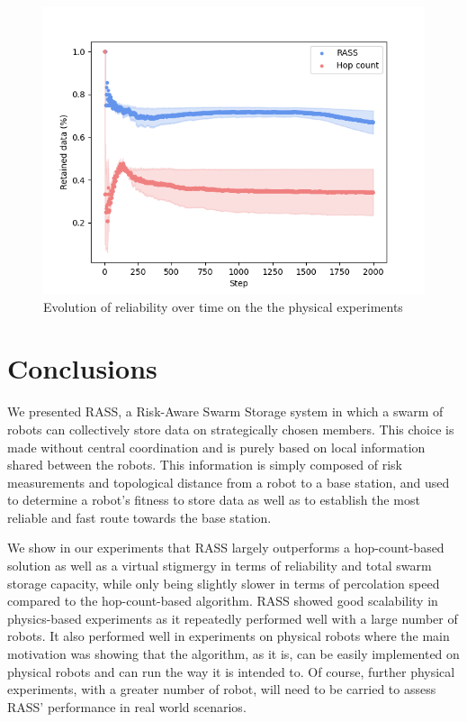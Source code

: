\documentclass[runningheads]{llncs}
\begin{document}
\begin{figure}[h]
	\centering
    \includegraphics[width=0.95\columnwidth]{figures/reliability.png}
    \caption{Evolution of reliability over time on the the physical experiments}
    \label{results:physicalRelaibility}
\vspace{-2mm}
\end{figure}

\section{Conclusions}
\label{conclusion}

We presented RASS, a Risk-Aware Swarm Storage system in which a swarm of robots can collectively store data on strategically chosen members. This choice is made without central coordination and is purely based on local information shared between the robots. This information is simply composed of risk measurements and topological distance from a robot to a base station, and used to determine a robot's fitness to store data as well as to establish the most reliable and fast route towards the base station.

We show in our experiments that RASS largely outperforms a hop-count-based solution as well as a virtual stigmergy in terms of reliability and total swarm storage capacity, while only being slightly slower in terms of percolation speed compared to the hop-count-based algorithm. RASS showed good scalability in physics-based experiments as it repeatedly performed well with a large number of robots. It also performed well in experiments on physical robots where the main motivation was showing that the algorithm, as it is, can be easily implemented on physical robots and can run the way it is intended to. Of course, further physical experiments, with a greater number of robot, will need to be carried to assess RASS' performance in real world scenarios.
\end{document}
